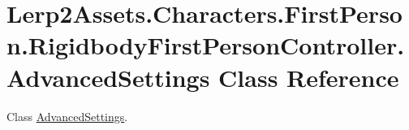 \hypertarget{class_lerp2_assets_1_1_characters_1_1_first_person_1_1_rigidbody_first_person_controller_1_1_advanced_settings}{}\section{Lerp2\+Assets.\+Characters.\+First\+Person.\+Rigidbody\+First\+Person\+Controller.\+Advanced\+Settings Class Reference}
\label{class_lerp2_assets_1_1_characters_1_1_first_person_1_1_rigidbody_first_person_controller_1_1_advanced_settings}


Class \hyperlink{class_lerp2_assets_1_1_characters_1_1_first_person_1_1_rigidbody_first_person_controller_1_1_advanced_settings}{Advanced\+Settings}.  


